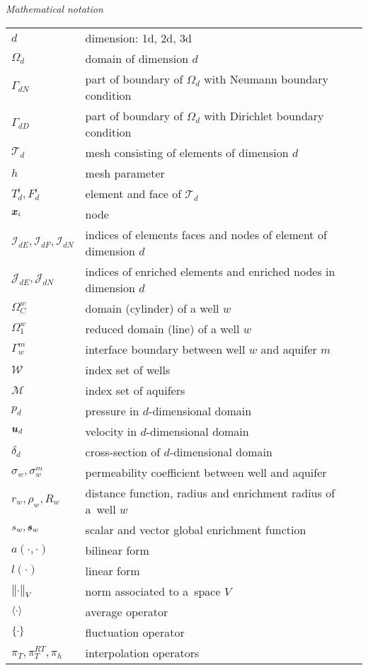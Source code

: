 \noindent\emph{Mathematical notation}
\vspace{0.5cm}

\begin{tabularx}{\linewidth}{@{}lX@{}}
$d$ & dimension: 1d, 2d, 3d \\
$\Omega_d$ & domain of dimension $d$ \\
$\Gamma_{dN}$ & part of boundary of $\Omega_d$ with Neumann boundary condition \\
$\Gamma_{dD}$ & part of boundary of $\Omega_d$ with Dirichlet boundary condition \\
$\mathcal T_d$ & mesh consisting of elements of dimension $d$ \\
$h$ & mesh parameter \\
$T^i_d, F^i_d$  & element and face of $\mathcal T_d$ \\
$\mathbf{\boldsymbol{x}}_i$ & node \\
$\mathcal I_{dE}, \mathcal I_{dF}, \mathcal I_{dN}$ & indices of elements faces and nodes of element of dimension $d$ \\
$\mathcal J_{dE}, \mathcal J_{dN}$ & indices of enriched elements and enriched nodes in dimension $d$ \\
$\Omega^w_C$ & domain (cylinder) of a well $w$ \\
$\Omega^w_1$ & reduced domain (line) of a well $w$ \\
$\Gamma^m_w$ & interface boundary between well $w$ and aquifer $m$ \\
$\mathcal W$ & index set of wells \\
$\mathcal M$ & index set of aquifers \\
$p_d$ & pressure in $d$-dimensional domain \\
$\mathbf{\boldsymbol{u}}_d$ & velocity in $d$-dimensional domain \\
$\delta_d$ & cross-section of $d$-dimensional domain \\
$\sigma_w, \sigma^m_w$ & permeability coefficient between well and aquifer \\
$r_w, \rho_w, R_w$ & distance function, radius and enrichment radius of a~well $w$ \\
$s_w, \mathbf{\boldsymbol{s}}_w$ & scalar and vector global enrichment function\\
$a(\cdot, \cdot)$ & bilinear form \\
$l(\cdot)$ & linear form \\
$\bigl\Vert\cdot\bigr\Vert_V$ & norm associated to a~space $V$\\
$\langle\cdot\rangle$ & average operator \\
$\{\cdot\}$ & fluctuation operator \\
$\pi_T, \pi^{RT}_T, \pi_h$ & interpolation operators \\
\end{tabularx}
